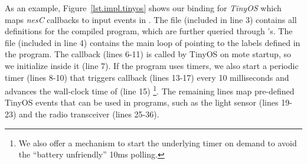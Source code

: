 As an example, Figure~\ref{lst.impl.tinyos} shows our binding for \emph{TinyOS} 
which maps \emph{nesC} callbacks to input events in \CEU.
%
The file  (included in line 3) contains all definitions for the 
compiled \CEU program, which are further queried through 's.
The file  (included in line 4) contains the main loop of \CEU 
pointing to the labels defined in the program.
The callback  (lines 6-11) is called by TinyOS on mote 
startup, so we initialize \CEU inside it (line 7).
If the \CEU program uses timers, we also start a periodic timer (lines 8-10) 
that triggers callback  (lines 13-17) every 10 milliseconds 
and advances the wall-clock time of \CEU (line 15)%
\footnote{We also offer a mechanism to start the underlying timer on demand to
avoid the ``battery unfriendly'' 10ms polling.}.
The remaining lines map pre-defined TinyOS events that can be used in \CEU 
programs, such as the light sensor (lines 19-23) and the radio transceiver 
(lines 25-36).

